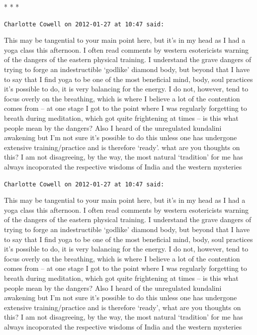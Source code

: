 
\begin{center}* * *\end{center}

\begin{footnotesize}\begin{sffamily}


\texttt{Charlotte Cowell on 2012-01-27 at 10:47 said: }

This may be tangential to your main point here, but it's in my head as I had a yoga class this afternoon. I often read comments by western esotericists warning of the dangers of the eastern physical training. I understand the grave dangers of trying to forge an indestructible `godlike' diamond body, but beyond that I have to say that I find yoga to be one of the most beneficial mind, body, soul practices it's possible to do, it is very balancing for the energy. I do not, however, tend to focus overly on the breathing, which is where I believe a lot of the contention comes from – at one stage I got to the point where I was regularly forgetting to breath during meditation, which got quite frightening at times – is this what people mean by the dangers? Also I heard of the unregulated kundalini awakening but I'm not sure it's possible to do this unless one has undergone extensive training/practice and is therefore `ready'. what are you thoughts on this? I am not disagreeing, by the way, the most natural `tradition' for me has always incoporated the respective wisdoms of India and the western mysteries

\texttt{Charlotte Cowell on 2012-01-27 at 10:47 said: }

This may be tangential to your main point here, but it's in my head as I had a yoga class this afternoon. I often read comments by western esotericists warning of the dangers of the eastern physical training. I understand the grave dangers of trying to forge an indestructible `godlike' diamond body, but beyond that I have to say that I find yoga to be one of the most beneficial mind, body, soul practices it's possible to do, it is very balancing for the energy. I do not, however, tend to focus overly on the breathing, which is where I believe a lot of the contention comes from – at one stage I got to the point where I was regularly forgetting to breath during meditation, which got quite frightening at times – is this what people mean by the dangers? Also I heard of the unregulated kundalini awakening but I'm not sure it's possible to do this unless one has undergone extensive training/practice and is therefore `ready', what are you thoughts on this? I am not disagreeing, by the way, the most natural `tradition' for me has always incoporated the respective wisdoms of India and the western mysteries



\end{sffamily}
\end{footnotesize}
